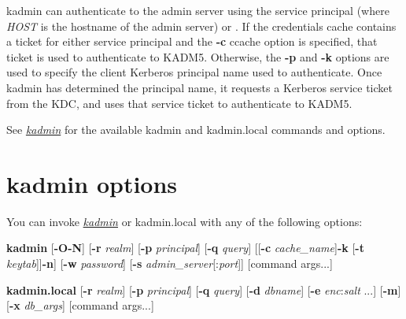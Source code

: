 \documentclass[letterpaper,10pt,english]{sphinxmanual}
\begin{document}
kadmin can authenticate to the admin server using the service
principal  (where \emph{HOST} is the hostname of the admin
server) or .  If the credentials cache contains a
ticket for either service principal and the \textbf{-c} ccache option is
specified, that ticket is used to authenticate to KADM5.  Otherwise,
the \textbf{-p} and \textbf{-k} options are used to specify the client Kerberos
principal name used to authenticate.  Once kadmin has determined the
principal name, it requests a  Kerberos service ticket
from the KDC, and uses that service ticket to authenticate to KADM5.

See {\hyperref[admin/admin_commands/kadmin_local:kadmin-1]{\emph{kadmin}}} for the available kadmin and kadmin.local
commands and options.


\section{kadmin options}
\label{admin/database:kadmin-options}
You can invoke {\hyperref[admin/admin_commands/kadmin_local:kadmin-1]{\emph{kadmin}}} or kadmin.local with any of the
following options:

\textbf{kadmin}
{[}\textbf{-O}\textbar{}\textbf{-N}{]}
{[}\textbf{-r} \emph{realm}{]}
{[}\textbf{-p} \emph{principal}{]}
{[}\textbf{-q} \emph{query}{]}
{[}{[}\textbf{-c} \emph{cache\_name}{]}\textbar{}{[}\textbf{-k} {[}\textbf{-t} \emph{keytab}{]}{]}\textbar{}\textbf{-n}{]}
{[}\textbf{-w} \emph{password}{]}
{[}\textbf{-s} \emph{admin\_server}{[}:\emph{port}{]}{]}
{[}command args...{]}

\textbf{kadmin.local}
{[}\textbf{-r} \emph{realm}{]}
{[}\textbf{-p} \emph{principal}{]}
{[}\textbf{-q} \emph{query}{]}
{[}\textbf{-d} \emph{dbname}{]}
{[}\textbf{-e} \emph{enc}:\emph{salt} ...{]}
{[}\textbf{-m}{]}
{[}\textbf{-x} \emph{db\_args}{]}
{[}command args...{]}
\end{document}
